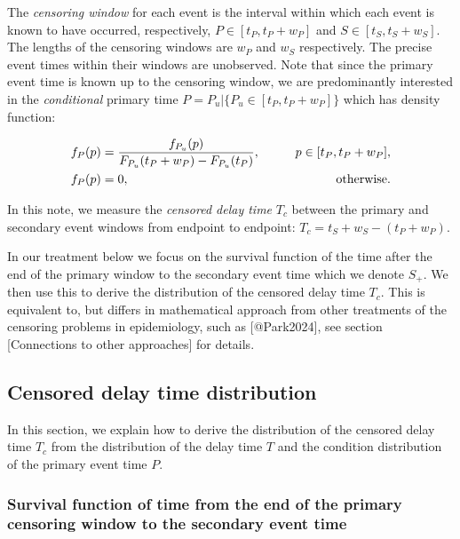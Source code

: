 \documentclass[10pt,letterpaper]{article}
\begin{document}
The \textit{censoring window} for each event is the interval within which each event is known to have occurred, respectively, $P \in [t_P, t_P + w_P]$ and $S \in [t_S, t_S + w_S]$. The lengths of the censoring windows are $w_P$ and $w_S$ respectively. The precise event times within their windows are unobserved. Note that since the primary event time is known up to the censoring window, we are predominantly interested in the \textit{conditional} primary time $P = P_{u} | \{ P_{u} \in [t_P, t_P + w_P]\}$ which has density function:

\begin{eqnarray}
    \begin{aligned}
    f_{P}(p) &= {f_{P_{u}}(p) \over F_{P_{u}}(t_P + w_P) - F_{P_{u}}(t_P)}, \qquad &p \in [t_P, t_P + w_P],\\
    f_{P}(p) &= 0, \qquad &\text{otherwise}.
    \end{aligned}
\end{eqnarray}


In this note, we measure the \textit{censored delay time} $T_c$ between the primary and secondary event windows from endpoint to endpoint: $T_c = t_S + w_S - (t_P + w_P)$. 


In our treatment below we focus on the survival function of the time after the end of the primary window to the secondary event time which we denote $S_{+}$. We then use this to derive the distribution of the censored delay time $T_c$. This is equivalent to, but differs in mathematical approach from other treatments of the censoring problems in epidemiology, such as [@Park2024], see section [Connections to other approaches] for details.

\subsection{Censored delay time distribution}
In this section, we explain how to derive the distribution of the censored delay time $T_c$ from the distribution of the delay time $T$ and the condition distribution of the primary event time $P$.

\subsubsection{Survival function of time from the end of the primary censoring window to the secondary event time}
\end{document}
